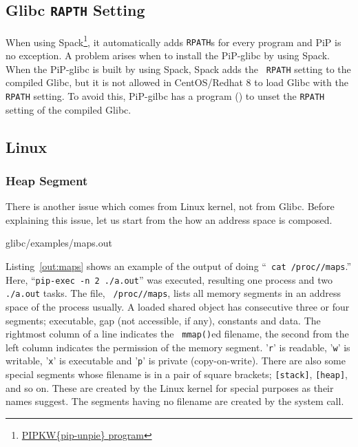 \subsection{Glibc {\tt RAPTH} Setting}

When using Spack\footnote{\url{PIPKW{pip-unpie} program}}, it
automatically adds {\tt RPATH}s for every program and PiP is no
exception. A problem arises when to install the PiP-glibc by using
Spack. When the PiP-glibc is built by using Spack, Spack adds the {\tt
  RPATH} setting to the compiled Glibc, but it is not allowed in
CentOS/Redhat 8 to load Glibc with the {\tt RPATH} setting. To avoid
this, PiP-gilbc has a program () to unset
the {\tt RPATH} setting of the compiled Glibc.

\subsection{Linux}

\subsubsection{Heap Segment}\label{sec:heap}

There is another issue which comes from Linux kernel, not from
Glibc. Before explaining this issue, let us start from the how an
address space is composed. 

 {glibc/examples/maps.out}

Listing~\ref{out:maps} shows an example of the output of doing ``{\tt
  cat /proc//maps}.'' Here, ``{\tt pip-exec -n 2
  ./a.out}'' was executed, resulting one  process
and two {\tt ./a.out} tasks. The file, {\tt
  /proc//maps}, lists all memory
segments in an address space of the process {\tt {}}
usually. A loaded shared object has consecutive three or four segments; 
executable, gap (not accessible, if any), constants and data. 
The rightmost column of a line indicates the {\tt
  mmap()}ed filename, the second from the left column indicates the
permission of the memory segment. '{\tt r}' is readable, '{\tt w}' is
writable, '{\tt x}' is executable and '{\tt p}' is private
(copy-on-write). There are also some special segments whose filename
is in a pair of square brackets; {\tt [stack]}, {\tt [heap]}, and so
on. These are created by the Linux kernel for special purposes as
their names suggest. The segments having no filename are created by
the  system call. 

